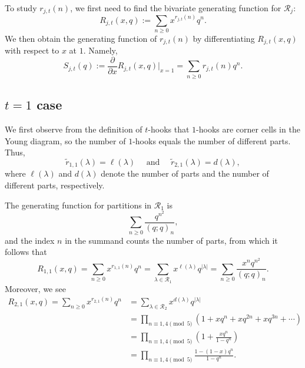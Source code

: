 \documentclass[11pt,reqno]{amsart}
\theoremstyle{remark}
\numberwithin{equation}{section}
\begin{document}
To study $r_{j,t}(n)$, we first need to find the bivariate generating function for  $\mathcal{R}_j$:
\[
	R_{j,t}(x,q):=\sum_{n\ge 0} x^{r_{j,t}(n)} q^{n}.
\]
We then obtain the generating function of $r_{j,t}(n)$ by differentiating $R_{j,t}(x,q)$ with respect to $x$ at $1$. Namely, 
\[
	S_{j,t}(q):=\frac{\partial } {\partial x} R_{j,t}(x,q)\bigg|_{x=1}=\sum_{n\ge 0}  r_{j,t}(n) q^n. 
\]


\subsection{$t=1$ case} \label{sec3.1}
We first observe from the definition of $t$-hooks that $1$-hooks are corner cells in the Young diagram, so the number of $1$-hooks equals the number of different parts. Thus,
\begin{equation*}
\widetilde{r}_{1,1} (\lambda) =\ell(\lambda) \quad \text{ and } \quad 
\widetilde{r}_{2,1} (\lambda) =d (\lambda),
\end{equation*}   
where $\ell(\lambda)$ and $d(\lambda)$ denote the number of parts and the number of different parts, respectively. 

The generating function for partitions in $\mathcal{R}_1$ is 
\begin{equation*}
    \sum_{n\ge 0}\frac{q^{n^2}}{(q;q)_n},
\end{equation*}
and the index $n$ in the summand counts the number of parts, from which it follows that
\[
	R_{1,1}(x,q)=\sum_{n\ge 0} x^{r_{1,1}(n)} q^{n}  =\sum_{\lambda\in \mathcal{R}_1} x^{\ell(\lambda)} q^{|\lambda|} =\sum_{n\ge 0} \frac{ x^n q^{n^2}}{(q;q)_n}.
\]
Moreover, we see   
\begin{align*}
	R_{2,1}(x,q)=\sum_{n\ge 0} x^{r_{2,1}(n)} q^{n} 
	&=\sum_{\lambda\in \mathcal{R}_2} x^{d(\lambda)} q^{|\lambda|}  \\
	&=\prod_{n\equiv 1,4 \!\!\!\pmod{5}}  (1+xq^{n}+xq^{2n}+xq^{3n}+\cdots) \\
	&= \prod_{n\equiv 1,4 \!\!\!\pmod{5}}  \left(1+\frac{xq^{n}}{1-q^n}\right)\\
	& = \prod_{n\equiv 1,4 \!\!\!\pmod{5}} \frac{1-(1-x)q^n}{1-q^n}. 
\end{align*}
\end{document}
